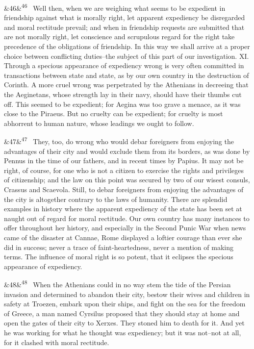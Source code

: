 \documentclass[12pt]{article}
\newcommand{\para}[1][]{\par\noindent\ifx&#1&\else\textsuperscript{\footnotesize #1}~\fi}
\begin{document}
\para[46] Well then, when we are weighing what seems to be expedient in friendship against what is morally right, let apparent expediency be disregarded and moral rectitude prevail; and when in friendship requests are submitted that are not morally right, let conscience and scrupulous regard for the right take precedence of the obligations of friendship. In this way we shall arrive at a proper choice between conflicting duties--the subject of this part of our investigation. XI. Through a specious appearance of expediency wrong is very often committed in transactions between state and state, as by our own country in the destruction of Corinth. A more cruel wrong was perpetrated by the Athenians in decreeing that the Aeginetans, whose strength lay in their navy, should have their thumbs cut off. This seemed to be expedient; for Aegina was too grave a menace, as it was close to the Piraeus. But no cruelty can be expedient; for cruelty is most abhorrent to human nature, whose leadings we ought to follow.

\para[47] They, too, do wrong who would debar foreigners from enjoying the advantages of their city and would exclude them from its borders, as was done by Pennus in the time of our fathers, and in recent times by Papius. It may not be right, of course, for one who is not a citizen to exercise the rights and privileges of citizenship; and the law on this point was secured by two of our wisest consuls, Crassus and Scaevola. Still, to debar foreigners from enjoying the advantages of the city is altogether contrary to the laws of humanity. There are splendid examples in history where the apparent expediency of the state has been set at naught out of regard for moral rectitude. Our own country has many instances to offer throughout her history, and especially in the Second Punic War when news came of the disaster at Cannae, Rome displayed a loftier courage than ever she did in success; never a trace of faint-heartedness, never a mention of making terms. The influence of moral right is so potent, that it eclipses the specious appearance of expediency.

\para[48] When the Athenians could in no way stem the tide of the Persian invasion and determined to abandon their city, bestow their wives and children in safety at Troezen, embark upon their ships, and fight on the sea for the freedom of Greece, a man named Cyrsilus proposed that they should stay at home and open the gates of their city to Xerxes. They stoned him to death for it. And yet he was working for what he thought was expediency; but it was not--not at all, for it clashed with moral rectitude.
\end{document}
